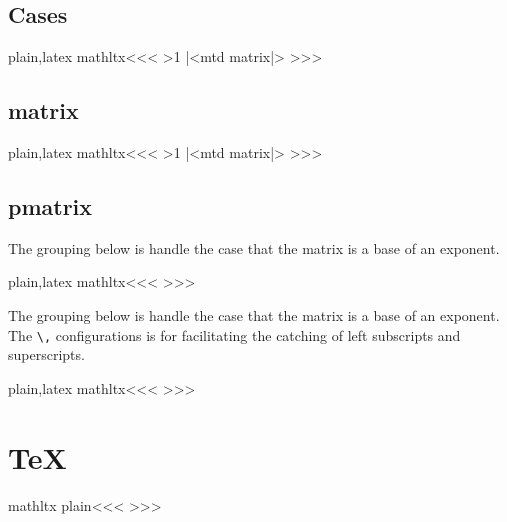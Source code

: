 {{%
\subsection{Cases}

\<plain,latex mathltx\><<<
    {}{}
    {}
    {\ifvmode \IgnorePar\fi {}}
    {\ifnum \HRow>1 \HCode{\string\cr\space}\fi}
    {}
    {|<mtd matrix|>}
    {}
>>>


\subsection{matrix}

\<plain,latex mathltx\><<<
   {} 
   {}
   {\ifnum \HRow>1 \HCode{\string\cr\space}\fi}
   {}
   {|<mtd matrix|>}
   {}
>>>



\subsection{pmatrix}


The grouping below is handle the case that the matrix is a base of an
exponent.


\<plain,latex mathltx\><<<
  {\bgroup}  {\egroup}
>>>



The grouping below is handle the case that the matrix is a base of an
exponent. The \verb|\,| configurations is for facilitating the
catching of  left subscripts and superscripts.


\<plain,latex mathltx\><<<
\Configure{,}
   {{\HCode{\string\,}}}
>>>




\section{TeX}


\<mathltx plain\><<<
   {}
   {}
   {}
   {}
   {}
   {}
\def\:eqalignno:{\Configure{noalign}
  {\HCode{<mtr><mtd \mml:class="noalign" colspan="2">}}%
  {\HCode{</mtd></mtr>}}}
>>>


}}
